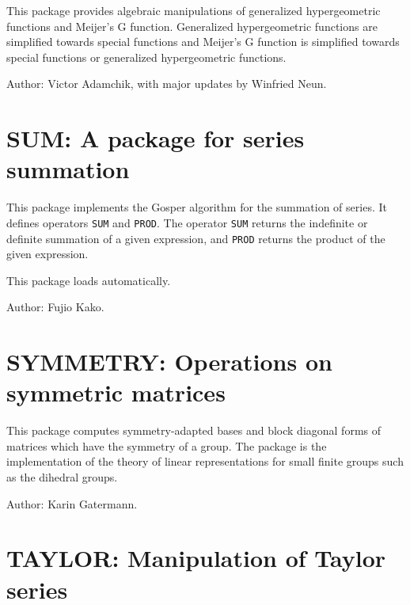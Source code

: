 
This package provides algebraic manipulations of generalized
hypergeometric functions and Meijer's G function.  Generalized
hypergeometric functions are simplified towards special functions and
Meijer's G function is simplified towards special functions or generalized
hypergeometric functions.

Author: Victor Adamchik, with major updates by Winfried Neun.


\newpage

\section{SUM: A package for series summation} 
\hypertarget{operator:SUM}{}
\hypertarget{operator:PROD}{}

This package implements the Gosper algorithm for the summation of series.
It defines operators {\tt SUM} and {\tt PROD}.  The operator {\tt SUM}
returns the indefinite or definite summation of a given expression, and
{\tt PROD} returns the product of the given expression.

This package loads automatically.

Author: Fujio Kako.


\newpage

\section{SYMMETRY: Operations on symmetric matrices} 

This package computes symmetry-adapted bases and block diagonal forms of
matrices which have the symmetry of a group.  The package is the
implementation of the theory of linear representations for small finite
groups such as the dihedral groups.

Author: Karin Gatermann.


\newpage

\section{TAYLOR: Manipulation of Taylor series}
 
 

